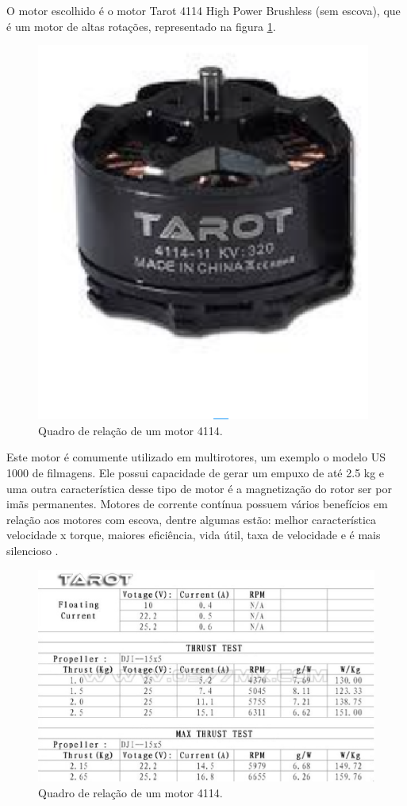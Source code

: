 O motor escolhido é o motor Tarot 4114 High Power Brushless (sem escova), que é um motor de altas rotações, representado na figura \ref{fig:tarot2}.

\begin{figure}[H]
    \centering
      \includegraphics[keepaspectratio=true,scale=0.5]{figuras/tarot2.eps}
    \caption{Quadro de relação de um motor 4114.}
    \label{fig:tarot2}
\end{figure}

Este motor é comumente utilizado em  multirotores, um exemplo o modelo US 1000 de filmagens. Ele possui capacidade de gerar um empuxo de até 2.5 kg e uma outra característica desse tipo de motor é a magnetização do rotor ser por imãs permanentes. Motores de corrente contínua possuem vários benefícios em relação aos motores com escova, dentre algumas estão: melhor característica velocidade x torque, maiores eficiência, vida útil, taxa de velocidade e é mais silencioso \cite{nascimento}.

\begin{figure}[H]
    \centering
      \includegraphics[keepaspectratio=true,scale=0.5]{figuras/tarot.eps}
    \caption{Quadro de relação de um motor 4114.}
    \label{fig:tarot}
\end{figure}

